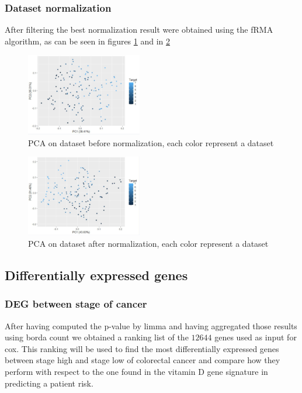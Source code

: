\documentclass[fleqn,10pt]{SelfArx} %
\begin{document}
		\subsubsection{Dataset normalization}
		After filtering the best normalization result were obtained using the fRMA algorithm, as can be seen in figures \ref{fig:pre_norm} and in \ref{fig:post_norm}

		\begin{figure}[ht]
			\includegraphics[width=0.45\textwidth]{figures/pre_norm.png}
			\caption{PCA on dataset before normalization, each color represent a dataset}
			\label{fig:pre_norm}
		\end{figure}

		\begin{figure}[ht]
			\includegraphics[width=0.45\textwidth]{figures/post_norm.png}
			\caption{PCA on dataset after normalization, each color represent a dataset}
			\label{fig:post_norm}
		\end{figure}

	\subsection{Differentially expressed genes}

		\subsubsection{DEG between stage of cancer}
		After having computed the p-value by limma and having aggregated those results using borda count we obtained a ranking list of the $12644$ genes used as input for cox.
		This ranking will be used to find the most differentially expressed genes between stage high and stage low of colorectal cancer and compare how they perform with respect to the one found in the vitamin D gene signature in predicting a patient risk.
\end{document}
